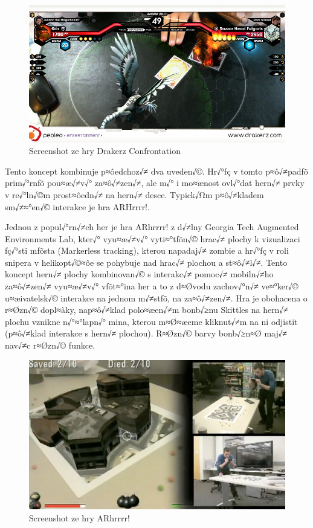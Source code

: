 \documentclass[twoside,12pt]{article}
\begin{document}
\begin{figure}[H]
    \includegraphics[width=424px, center]{images/drakerz-confrontation.jpg}
    \caption{Screenshot ze hry Drakerz Confrontation}
    \label{drakerz_screenshot}
\end{figure}

Tento koncept kombinuje p≈ôedchoz√≠ dva uveden√©. Hr√°ƒç v tomto p≈ô√≠padƒõ prim√°rnƒõ pou≈æ√≠v√° za≈ô√≠zen√≠, ale m√° i mo≈ænost ovl√°dat hern√≠ prvky v re√°ln√©m prost≈ôedn√≠ na hern√≠ desce. Typick√Ωm p≈ô√≠kladem sm√≠≈°en√© interakce je hra ARHrrrr!.

% 
Jednou z popul√°rn√≠ch her je hra ARhrrrr! z d√≠lny Georgia Tech Augmented Environments Lab, kter√° vyu≈æ√≠v√° vyti≈°tƒõn√© hrac√≠ plochy k vizualizaci ƒç√°sti mƒõsta (Markerless tracking), kterou napadaj√≠ zombie a hr√°ƒç v roli snipera v helikopt√©≈ôe se pohybuje nad hrac√≠ plochou a st≈ô√≠l√≠. Tento koncept hern√≠ plochy kombinovan√© s interakc√≠ pomoc√≠ mobiln√≠ho za≈ô√≠zen√≠ vyu≈æ√≠v√° vƒõt≈°ina her a to z d≈Øvodu zachov√°n√≠ ve≈°ker√© u≈æivatelsk√© interakce na jednom m√≠stƒõ, na za≈ô√≠zen√≠. Hra je obohacena o r≈Øzn√© dopl≈àky, nap≈ô√≠klad polo≈æen√≠m bonb√≥nu Skittles na hern√≠ plochu vznikne n√°≈°lapn√° mina, kterou m≈Ø≈æeme kliknut√≠m na ni odjistit (p≈ô√≠klad interakce s hern√≠ plochou). R≈Øzn√© barvy bonb√≥n≈Ø maj√≠ nav√≠c r≈Øzn√© funkce.

\begin{figure}[H]
    \includegraphics[width=424px, center]{images/arhrrrr.jpg}
    \caption{Screenshot ze hry ARhrrrr!}
    \label{arhrrrr_screenshot}
\end{figure}
\end{document}
